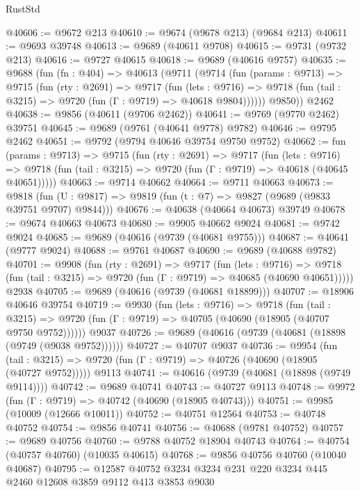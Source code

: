 \begin{lexlean}{RustStd}
\begin{coremodule}
@40606 := @9672 @213
@40610 := @9674 (@9678 @213) (@9684 @213)
@40611 := @9693 @39748
@40613 := @9689 (@40611 @9708)
@40615 := @9731 (@9732 @213)
@40616 := @9727 @40615
@40618 := @9689 (@40616 @9757)
@40635 := @9688
    (fun (fn : @404) =>
    @40613
      (@9711
        (@9714
          (fun (params : @9713) =>
          @9715
            (fun (rty : @2691) =>
            @9717
              (fun (lets : @9716) =>
              @9718 (fun (tail : @3215) => @9720 (fun (Γ : @9719) => @40618 @9804))))))
        @9850))
    @2462
@40638 := @9856 (@40611 (@9706 @2462))
@40641 := @9769 (@9770 @2462) @39751
@40645 := @9689 (@9761 (@40641 @9778) @9782)
@40646 := @9795 @2462
@40651 := @9792 (@9794 @40646 @39754 @9750 @9752)
@40662 := fun (params : @9713) =>
  @9715
    (fun (rty : @2691) =>
    @9717
      (fun (lets : @9716) =>
      @9718 (fun (tail : @3215) => @9720 (fun (Γ : @9719) => @40618 (@40645 @40651)))))
@40663 := @9714 @40662
@40664 := @9711 @40663
@40673 := @9818
    (fun (U : @9817) => @9819 (fun (t : @7) => @9827 (@9689 (@9833 @39751 @9707) @9844)))
@40676 := @40638 (@40664 @40673) @39749
@40678 := @9674 @40663 @40673
@40680 := @9905 @40662 @9024
@40681 := @9742 @9024
@40685 := @9689 (@40616 (@9739 (@40681 @9755)))
@40687 := @40641 (@9777 @9024)
@40688 := @9761 @40687
@40690 := @9689 (@40688 @9782)
@40701 := @9908
    (fun (rty : @2691) =>
    @9717
      (fun (lets : @9716) =>
      @9718 (fun (tail : @3215) => @9720 (fun (Γ : @9719) => @40685 (@40690 @40651)))))
    @2938
@40705 := @9689 (@40616 (@9739 (@40681 @18899)))
@40707 := @18906 @40646 @39754
@40719 := @9930
    (fun (lets : @9716) =>
    @9718
      (fun (tail : @3215) =>
      @9720 (fun (Γ : @9719) => @40705 (@40690 (@18905 (@40707 @9750 @9752))))))
    @9037
@40726 := @9689 (@40616 (@9739 (@40681 (@18898 (@9749 (@9038 @9752))))))
@40727 := @40707 @9037
@40736 := @9954
    (fun (tail : @3215) => @9720 (fun (Γ : @9719) => @40726 (@40690 (@18905 (@40727 @9752)))))
    @9113
@40741 := @40616 (@9739 (@40681 (@18898 (@9749 @9114))))
@40742 := @9689 @40741
@40743 := @40727 @9113
@40748 := @9972 (fun (Γ : @9719) => @40742 (@40690 (@18905 @40743)))
@40751 := @9985 (@10009 (@12666 @10011))
@40752 := @40751 @12564
@40753 := @40748 @40752
@40754 := @9856 @40741
@40756 := @40688 (@9781 @40752)
@40757 := @9689 @40756
@40760 := @9788 @40752 @18904 @40743
@40764 := @40754 (@40757 @40760) (@10035 @40615)
@40768 := @9856 @40756 @40760 (@10040 @40687)
@40795 := @12587
    @40752
    @3234
    @3234
    @231
    @220
    @3234
    @445
    @2460
    @12608
    @3859
    @9112
    @413
    @3853
    @9030

\end{coremodule}
\end{lexlean}
